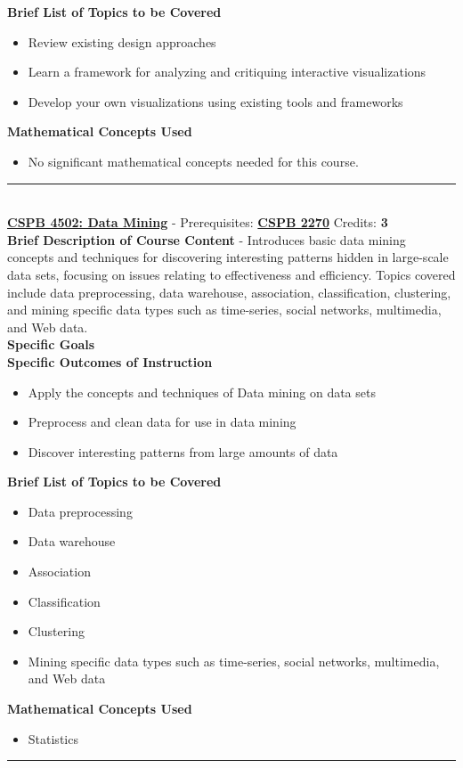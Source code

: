 \documentclass{article}
\newcommand{\horizontalline}{\noindent \rule{\textwidth}{0.5pt} \\}
\begin{document}
\noindent \textbf{Brief List of Topics to be Covered}
\begin{itemize}
    \item Review existing design approaches
    \item Learn a framework for analyzing and critiquing interactive visualizations
    \item Develop your own visualizations using existing tools and frameworks
\end{itemize}

\noindent \textbf{Mathematical Concepts Used}
\begin{itemize}
    \item No significant mathematical concepts needed for this course.
\end{itemize}
\horizontalline
\noindent \href{https://www.colorado.edu/program/cspb/cspb-4502-data-mining}{\textbf{CSPB 4502: Data Mining}} - Prerequisites: \href{https://www.colorado.edu/program/cspb/cspb-2270-computer-science-2-data-structures}{\textbf{CSPB 2270}} Credits: \textbf{3} \\

\noindent \textbf{Brief Description of Course Content} - Introduces basic data mining concepts and techniques for discovering interesting patterns hidden in large-scale data sets, focusing on issues relating to effectiveness and efficiency. Topics covered include data preprocessing, data warehouse, association, classification, clustering, and mining specific data types such as time-series, social networks, multimedia, and Web data. \\

\noindent \textbf{Specific Goals} \\

\noindent \textbf{Specific Outcomes of Instruction}
\begin{itemize}
    \item Apply the concepts and techniques of Data mining on data sets
    \item Preprocess and clean data for use in data mining
    \item Discover interesting patterns from large amounts of data
\end{itemize}

\noindent \textbf{Brief List of Topics to be Covered}
\begin{itemize}
    \item Data preprocessing
    \item Data warehouse 
    \item Association
    \item Classification
    \item Clustering
    \item Mining specific data types such as time-series, social networks, multimedia, and Web data
\end{itemize}

\noindent \textbf{Mathematical Concepts Used}
\begin{itemize}
    \item Statistics
\end{itemize}
\horizontalline
\end{document}
